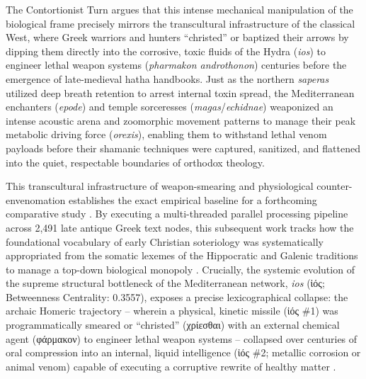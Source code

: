 \documentclass[11pt,twoside,letterpaper]{article}
\begin{document}
The Contortionist Turn argues that this intense mechanical manipulation of the biological frame precisely mirrors the transcultural infrastructure of the classical West, where Greek warriors and hunters ``christed'' or baptized their arrows by dipping them directly into the corrosive, toxic fluids of the Hydra (\textit{ios}) to engineer lethal weapon systems (\textit{pharmakon androthonon}) centuries before the emergence of late-medieval hatha handbooks. Just as the northern \textit{saperas} utilized deep breath retention to arrest internal toxin spread, the Mediterranean enchanters (\textit{epode}) and temple sorceresses (\textit{magas}/\textit{echidnae}) weaponized an intense acoustic arena and zoomorphic movement patterns to manage their peak metabolic driving force (\textit{orexis}), enabling them to withstand lethal venom payloads before their shamanic techniques were captured, sanitized, and flattened into the quiet, respectable boundaries of orthodox theology.

This transcultural infrastructure of weapon-smearing and physiological counter-envenomation establishes the exact empirical baseline for a forthcoming comparative study \citep{McCartneyForthcomingD}. By executing a multi-threaded parallel processing pipeline across 2,491 late antique Greek text nodes, this subsequent work tracks how the foundational vocabulary of early Christian soteriology was systematically appropriated from the somatic lexemes of the Hippocratic and Galenic traditions to manage a top-down biological monopoly \citep{McCartneyForthcomingD}. Crucially, the systemic evolution of the supreme structural bottleneck of the Mediterranean network, \textit{ios} (\textgreek{ἰός}; Betweenness Centrality: 0.3557), exposes a precise lexicographical collapse: the archaic Homeric trajectory -- wherein a physical, kinetic missile (\textgreek{ἰός} \#1) was programmatically smeared or ``christed'' (\textgreek{χρίεσθαι}) with an external chemical agent (\textgreek{φάρμακον}) to engineer lethal weapon systems -- collapsed over centuries of oral compression into an internal, liquid intelligence (\textgreek{ἰός} \#2; metallic corrosion or animal venom) capable of executing a corruptive rewrite of healthy matter \citep{McCartneyForthcomingD}. 
\end{document}
